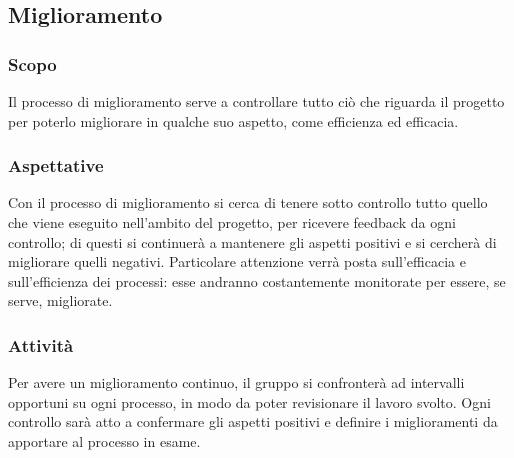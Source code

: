 \subsection{Miglioramento}
\subsubsection{Scopo}
Il processo di miglioramento serve a controllare tutto ciò che riguarda il progetto per poterlo migliorare in 
qualche suo aspetto, come efficienza ed efficacia.
\subsubsection{Aspettative}
Con il processo di miglioramento si cerca di tenere sotto controllo tutto quello che viene eseguito 
nell'ambito del progetto, per ricevere feedback da ogni controllo; di questi si continuerà a mantenere gli 
aspetti positivi e si cercherà di migliorare quelli negativi. Particolare attenzione verrà posta 
sull'efficacia e sull'efficienza dei processi: esse andranno costantemente monitorate per essere, se serve, 
migliorate.
\subsubsection{Attività}
Per avere un miglioramento continuo, il gruppo si confronterà ad intervalli opportuni su ogni processo, in 
modo da poter revisionare il lavoro svolto. Ogni controllo sarà atto a confermare gli aspetti positivi e 
definire i miglioramenti da apportare al processo in esame.
